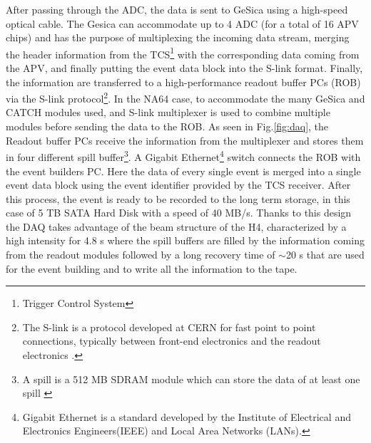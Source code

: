 After passing through the ADC, the data is sent to GeSica using a high-speed optical cable. The Gesica can accommodate up to 4 ADC (for a total of 16 APV chips) and has the purpose of multiplexing the incoming data stream, merging the header information from the TCS\footnote{Trigger Control System} with the corresponding data coming from the APV, and finally putting the event data block into the S-link format. Finally, the information are transferred to a high-performance readout buffer PCs (ROB) via the S-link protocol\footnote{The S-link is a protocol developed at CERN for fast point to point connections, typically between front-end electronics and the readout electronics \cite{s-link}.}. In the NA64 case, to accommodate the many GeSica and CATCH modules used, and S-link multiplexer is used to combine multiple modules before sending the data to the ROB. As seen in Fig.\ref{fig:daq}, the Readout buffer PCs receive the information from the multiplexer and stores them in four different spill buffer\footnote{A spill is a 512 MB SDRAM module which can store the data of at least one spill \cite{COMPASS-daq}}. A Gigabit Ethernet\footnote{Gigabit Ethernet is a standard developed by the Institute of Electrical and Electronics Engineers(IEEE) and Local Area Networks (LANs).} switch connects the ROB with the event builders PC. Here the data of every single event is merged into a single event data block using the event identifier provided by the TCS receiver. After this process, the event is ready to be recorded to the long term storage, in this case of 5 TB SATA Hard Disk with a speed of 40 MB/s. Thanks to this design the DAQ takes advantage of the beam structure of the H4, characterized by a high intensity for 4.8 \si{\second} where the spill buffers are filled by the information coming from the readout modules followed by a long recovery time of $\sim$20 \si{\second} that are used for the event building and to write all the information to the tape.

